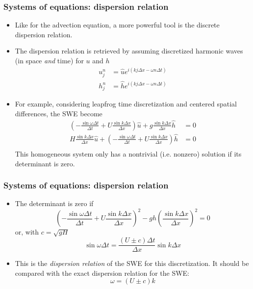 \documentclass[aspectratio=43,9pt]{beamer}
\begin{document}
%
\begin{frame}
	\frametitle{Systems of equations: dispersion relation}
	\begin{itemize}
		\item Like for the advection equation, a more powerful tool is the discrete dispersion relation.
		\item The dispersion relation is retrieved by assuming discretized harmonic waves (in space \emph{and} time) for $u$ and $h$
			\begin{align*}
				u_j^n&=\hat u e^{i\left(k j \Delta x- \omega n \Delta t\right)}	\\
				h_j^n&=\hat h e^{i\left(k j \Delta x- \omega n \Delta t\right)}
			\end{align*}
		\item For example, considering leapfrog time discretization and centered spatial differences, the SWE become
			\begin{align*}
					\left(-\frac{\sin \omega \Delta t}{\Delta t} + U\frac{\sin k \Delta x}{\Delta x}\right) \hat u	+	g \frac{\sin k \Delta x}{\Delta x}\hat h	&	= 0	\\
					H \frac{\sin k \Delta x}{\Delta x}\hat u + \left(-\frac{\sin \omega \Delta t}{\Delta t} + U\frac{\sin k \Delta x}{\Delta x}\right) \hat h	&	= 0	\\
			\end{align*}
			This homogeneous system only has a nontrivial (i.e. nonzero) solution if its determinant is zero.
	\end{itemize}
\end{frame}
%
%
\begin{frame}
	\frametitle{Systems of equations: dispersion relation}
	\begin{itemize}
		\item The determinant is zero if
			\begin{equation*}
				\left(-\frac{\sin \omega \Delta t}{\Delta t} + U\frac{\sin k \Delta x}{\Delta x}\right)^2-gh\left(\frac{\sin k \Delta x}{\Delta x}\right)^2=0
			\end{equation*} 
			or, with $c=\sqrt{gH}$
			\begin{equation*}
				\sin\omega \Delta t=\frac{(U\pm c)\Delta t}{\Delta x}\sin k \Delta x
			\end{equation*}\vspace*{2ex}
		\item This is the \emph{dispersion relation} of the SWE for this discretization. It should be compared with the exact dispersion relation for the SWE:
			\begin{equation*}
				\omega=(U\pm c) k
			\end{equation*}
	\end{itemize}
\end{frame}
\end{document}
